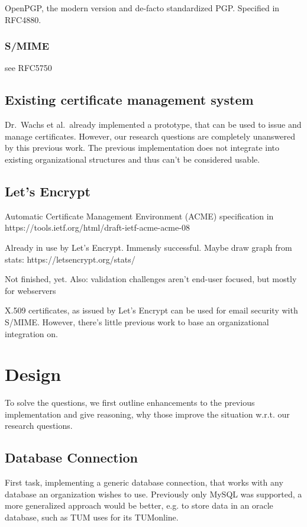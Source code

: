 OpenPGP, the modern version and de-facto standardized PGP.
Specified in RFC4880.

\subsection{S/MIME}\label{subsec:s/mime}
see RFC5750

\section{Existing certificate management system}\label{sec:existingCertificateManagementSystem}

Dr.\ Wachs et al.\ already implemented a prototype, that can be used to issue and manage certificates.
However, our research questions are completely unanswered by this previous work.
The previous implementation does not integrate into existing organizational structures and thus can't be considered
usable.

\section{Let's Encrypt}\label{sec:let'sEncrypt}

Automatic Certificate Management Environment (ACME) specification in https://tools.ietf.org/html/draft-ietf-acme-acme-08

Already in use by Let's Encrypt. Immensly successful. Maybe draw graph from stats: https://letsencrypt.org/stats/

Not finished, yet. Also: validation challenges aren't end-user focused, but mostly for webservers

X.509 certificates, as issued by Let's Encrypt can be used for email security with S/MIME. However, there's little
previous work to base an organizational integration on.

\chapter{Design}\label{ch:design}

To solve the questions, we first outline enhancements to the previous implementation and give reasoning, why those
improve the situation w.r.t. our research questions.

\section{Database Connection}\label{sec:databaseConnection}
First task, implementing a generic database connection, that works with any database an organization wishes to use.
Previously only MySQL was supported, a more generalized approach would be better, e.g. to store data in an oracle
database, such as TUM uses for its TUMonline.

